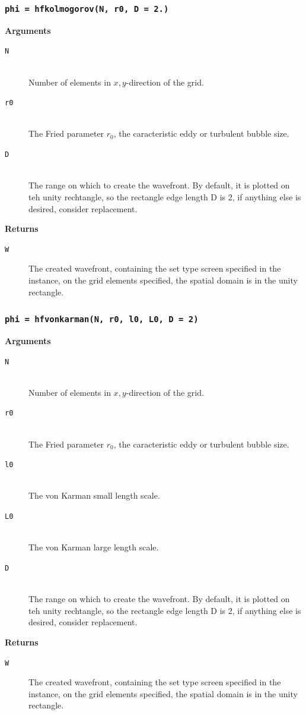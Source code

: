 \documentclass{article}
\begin{document}
\newpage
\subsubsection*{\texttt{phi = hfkolmogorov(N, r0, D = 2.)}}
\textbf{Arguments}
\begin{description}
  \item[\texttt{N}] \hfill \\
  Number of elements in $x,y$-direction of the grid.
  \item[\texttt{r0}] \hfill \\
  The Fried parameter $r_0$, the caracteristic eddy or turbulent bubble size.
  \item[\texttt{D}] \hfill \\
 	The range on which to create the wavefront. By default, it is plotted on teh unity rechtangle, so the rectangle edge length D is 2, if anything else is desired, consider replacement.  
\end{description}
\textbf{Returns}
\begin{description}
	\item[\texttt{W}]
	The created wavefront, containing the set type screen specified in the instance, on the grid elements specified, the spatial domain is in the unity rectangle.
\end{description}

\newpage
\subsubsection*{\texttt{phi = hfvonkarman(N, r0, l0, L0, D = 2)}}
\textbf{Arguments}
\begin{description}
  \item[\texttt{N}] \hfill \\
  Number of elements in $x,y$-direction of the grid.
  \item[\texttt{r0}] \hfill \\
  The Fried parameter $r_0$, the caracteristic eddy or turbulent bubble size.
  \item[\texttt{l0}] \hfill \\
  The von Karman small length scale.
  \item[\texttt{L0}] \hfill \\
  The von Karman large length scale.
  \item[\texttt{D}] \hfill \\
 	The range on which to create the wavefront. By default, it is plotted on teh unity rechtangle, so the rectangle edge length D is 2, if anything else is desired, consider replacement. 
\end{description}
\textbf{Returns}
\begin{description}
	\item[\texttt{W}]
	The created wavefront, containing the set type screen specified in the instance, on the grid elements specified, the spatial domain is in the unity rectangle.
\end{description}
\end{document}
